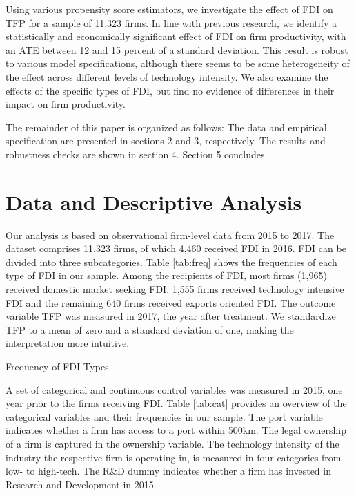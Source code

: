 \documentclass[a4paper,11pt]{scrartcl}
\begin{document}
Using various propensity score estimators, we investigate the effect of FDI on TFP for a sample of 11,323 firms. In line with previous research, we 
identify a statistically and economically significant effect of FDI on firm productivity, with an ATE between 12 and 15 percent of a standard deviation. This result is robust to various model specifications, although there seems to be some heterogeneity of the effect across different levels of technology intensity. We also examine the effects of the specific types of FDI, but find no evidence of differences in their impact on firm productivity.

The remainder of this paper is organized as follows: The data and empirical specification are presented in sections 2 and 3, respectively. The results and robustness checks are shown in section 4. Section 5 concludes.

\section{Data and Descriptive Analysis}
Our analysis is based on observational firm-level data from 2015 to 2017. The dataset comprises 11,323 firms, of which 4,460 received FDI in 2016. FDI can be divided into three subcategories. Table \ref{tab:freq} shows the frequencies of each type of FDI in our sample. Among the recipients of FDI, most firms (1,965) received domestic market seeking FDI. 1,555 firms received technology intensive FDI and the remaining 640 firms received exports oriented FDI. The outcome variable TFP was measured in 2017, the year after treatment. 
We standardize TFP to a mean of zero and a standard deviation of one, making the interpretation more intuitive. 

\begin{table}[h!]
	\centering
	\caption{Frequency of FDI Types} 
	
\label{tab:freq}
\end{table}

A set of categorical and continuous control variables was measured in 2015, one year prior to the firms receiving FDI. Table \ref{tab:cat} provides an overview of the categorical variables and their frequencies in our sample. 
The port variable indicates whether a firm has access to a port within 500km. The legal ownership of a firm is captured in the ownership variable. The technology intensity of the industry the respective firm is operating in, is measured in four categories from low- to high-tech. The R\&D dummy indicates whether a firm has invested in Research and Development in 2015. \\
\end{document}
